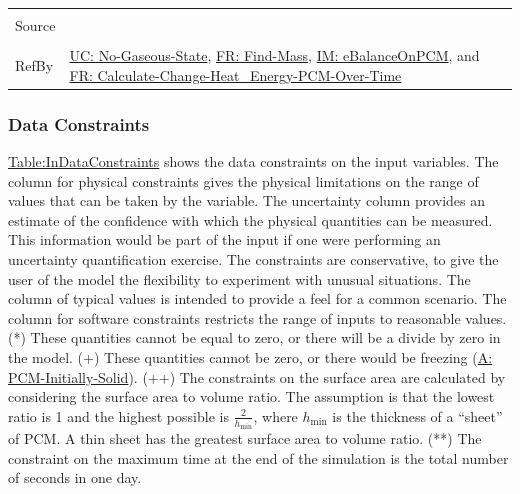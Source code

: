 \documentclass[12pt]{article}
\begin{document}
\begin{minipage}{\textwidth}
\begin{tabular}{>{\raggedright}p{}>{\raggedright\arraybackslash}p{}}
\\ \midrule \\
Source & \cite{koothoor2013}
         
\\ \midrule \\
RefBy & \hyperref[unlikeChgNGS]{UC: No-Gaseous-State}, \hyperref[findMass]{FR: Find-Mass}, \hyperref[IM:eBalanceOnPCM]{IM: eBalanceOnPCM}, and \hyperref[calcChgHeatEnergyPCMOverTime]{FR: Calculate-Change-Heat\_Energy-PCM-Over-Time}
        
\\ \bottomrule
\end{tabular}
\end{minipage}

\subsubsection{Data Constraints}
\label{Sec:DataConstraints}
\hyperref[Table:InDataConstraints]{Table:InDataConstraints} shows the data constraints on the input variables. The column for physical constraints gives the physical limitations on the range of values that can be taken by the variable. The uncertainty column provides an estimate of the confidence with which the physical quantities can be measured. This information would be part of the input if one were performing an uncertainty quantification exercise. The constraints are conservative, to give the user of the model the flexibility to experiment with unusual situations. The column of typical values is intended to provide a feel for a common scenario. The column for software constraints restricts the range of inputs to reasonable values. (*) These quantities cannot be equal to zero, or there will be a divide by zero in the model. (+) These quantities cannot be zero, or there would be freezing (\hyperref[assumpPIS]{A: PCM-Initially-Solid}). (++) The constraints on the surface area are calculated by considering the surface area to volume ratio. The assumption is that the lowest ratio is 1 and the highest possible is $\frac{2}{{h_{\text{min}}}}$, where ${h_{\text{min}}}$ is the thickness of a ``sheet'' of PCM. A thin sheet has the greatest surface area to volume ratio. (**) The constraint on the maximum time at the end of the simulation is the total number of seconds in one day.
\end{document}

